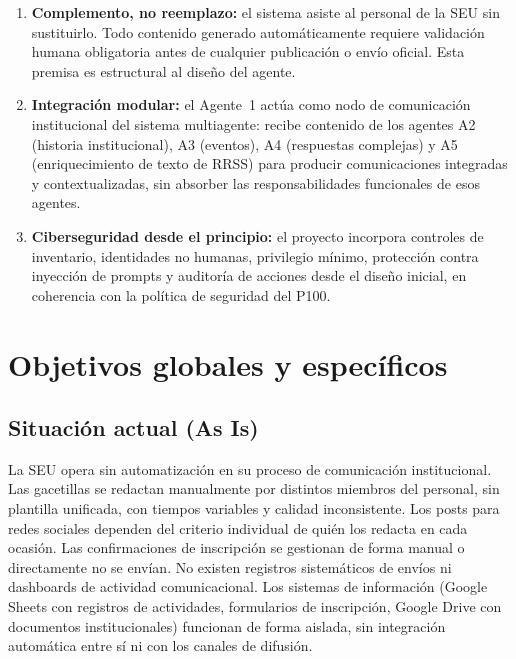 \documentclass[a4paper, 12pt]{article}
\begin{document}
\begin{enumerate}[label=\arabic*.]
  \item \textbf{Complemento, no reemplazo:} el sistema asiste al personal de la \ac{SEU} sin sustituirlo. Todo contenido generado autom\'aticamente requiere validaci\'on humana obligatoria antes de cualquier publicaci\'on o env\'io oficial. Esta premisa es estructural al dise\~no del agente.

  \item \textbf{Integraci\'on modular:} el Agente~1 act\'ua como nodo de comunicaci\'on institucional del sistema multiagente: recibe contenido de los agentes A2 (historia institucional), A3 (eventos), A4 (respuestas complejas) y A5 (enriquecimiento de texto de \ac{RRSS}) para producir comunicaciones integradas y contextualizadas, sin absorber las responsabilidades funcionales de esos agentes.

  \item \textbf{Ciberseguridad desde el principio:} el proyecto incorpora controles de inventario, identidades no humanas, privilegio m\'inimo, protecci\'on contra inyecci\'on de prompts y auditor\'ia de acciones desde el dise\~no inicial, en coherencia con la pol\'itica de seguridad del \ac{P100}.
\end{enumerate}

\section{Objetivos globales y espec\'ificos}

\subsection{Situaci\'on actual (As Is)}

La \ac{SEU} opera sin automatizaci\'on en su proceso de comunicaci\'on institucional. Las gacetillas se redactan manualmente por distintos miembros del personal, sin plantilla unificada, con tiempos variables y calidad inconsistente. Los posts para redes sociales dependen del criterio individual de qui\'en los redacta en cada ocasi\'on. Las confirmaciones de inscripci\'on se gestionan de forma manual o directamente no se env\'ian. No existen registros sistem\'aticos de env\'ios ni dashboards de actividad comunicacional. Los sistemas de informaci\'on (Google Sheets con registros de actividades, formularios de inscripci\'on, Google Drive con documentos institucionales) funcionan de forma aislada, sin integraci\'on autom\'atica entre s\'i ni con los canales de difusi\'on.
\end{document}
